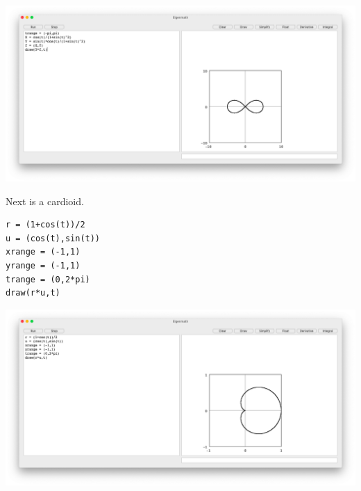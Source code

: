 \begin{center}
\includegraphics[scale=0.2]{lemniscate.png}
\end{center}

Next is a cardioid.

\begin{Verbatim}[formatcom=\color{blue},samepage=true]
r = (1+cos(t))/2
u = (cos(t),sin(t))
xrange = (-1,1)
yrange = (-1,1)
trange = (0,2*pi)
draw(r*u,t)
\end{Verbatim}

\begin{center}
\includegraphics[scale=0.2]{cardioid.png}
\end{center}

